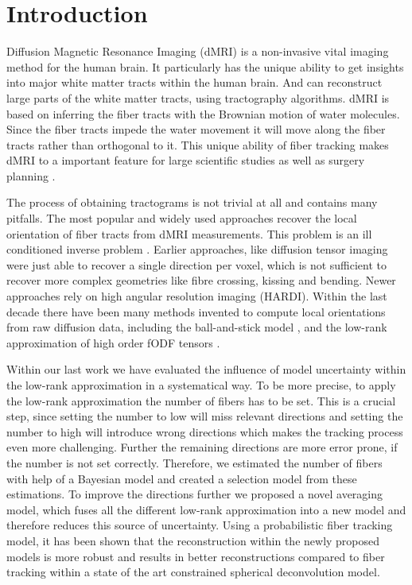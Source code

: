 \section{Introduction}
Diffusion Magnetic Resonance Imaging (dMRI) \cite{LeBihan:1986} is a
non-invasive vital imaging method for the human brain. It particularly has the
unique ability to get insights into major white matter tracts within the human
brain. And can
reconstruct large parts of the white matter tracts, using tractography algorithms. dMRI is based on
inferring the fiber tracts with the Brownian motion of water molecules. Since
the fiber tracts impede the water movement it will move along the fiber tracts
rather than orthogonal to it. 
This unique ability of fiber tracking makes dMRI to a important feature for large
scientific studies \cite{Sotiropoulos:2013, Tobisch:2018Frontiers} as well as surgery planning \cite{Yang:2021}.

The process of obtaining tractograms is not trivial at all and contains many
pitfalls. The most popular and widely used approaches recover the local
orientation of fiber tracts from dMRI measurements. This problem is an ill
conditioned inverse problem \cite{TOURNIER20071459}. Earlier approaches, like
diffusion tensor imaging \cite{BASSER1994247}
were just able to recover a single direction per voxel, which is not sufficient
to recover more complex geometries like fibre crossing, kissing and bending.
Newer approaches rely on high angular resolution imaging (HARDI). Within the
last decade there have been many methods invented to compute local orientations
from raw diffusion data, including the
ball-and-stick model \cite{BEHRENS2007144}, and the low-rank approximation of high order fODF tensors
\cite{lowrank, Ankele:CARS2017}.

Within our last work we have evaluated the influence of model uncertainty within
the low-rank approximation in a systematical way. To be more precise, to
apply the low-rank approximation the number of fibers has to be set. This is a
crucial step, since setting the number to low will miss relevant directions and
setting the number to high will introduce wrong directions which makes the
tracking process even more challenging. Further the remaining directions are
more error prone, if the number is not set correctly. 
Therefore, we estimated the number of fibers with help of a Bayesian model and
created a selection model from these estimations. To improve the directions
further we proposed a novel averaging model, which fuses all the different
low-rank approximation into a new model and therefore reduces this source of uncertainty.
Using a probabilistic fiber tracking model, it has been shown that the
reconstruction within the newly proposed models is more robust and results in
better reconstructions compared to fiber tracking within a state of the art
constrained spherical deconvolution model.

